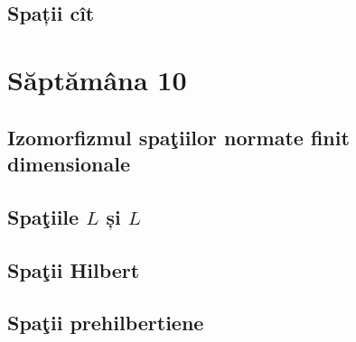 \documentclass[a4paper,12pt]{article}
\theoremstyle{change}
\begin{document}
\subsection{Spații cît}

\section{Săptămâna 10}


\subsection{Izomorfizmul spaţiilor normate finit dimensionale}

\subsection{Spaţiile $L$ și $L$}


\subsection{Spaţii  Hilbert}

\subsection{Spaţii prehilbertiene}

\end{document}
